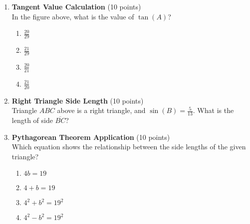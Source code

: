 \begin{enumerate}
  \newpage

  \item \textbf{Tangent Value Calculation} (10 points)\\
  In the figure above, what is the value of $\tan(A)$?
  \begin{enumerate}[label=(\Alph*)]
    \item $\frac{20}{29}$
    \item $\frac{21}{29}$
    \item $\frac{20}{21}$
    \item $\frac{21}{20}$
  \end{enumerate}
  \begin{subanswer}
  \end{subanswer}

  \item \textbf{Right Triangle Side Length} (10 points)\\
  Triangle $ABC$ above is a right triangle, and $\sin(B)=\frac{5}{13}$. What is the length of side $\overline{BC}$?
  \begin{subanswer}
  \end{subanswer}

  \newpage

  \item \textbf{Pythagorean Theorem Application} (10 points)\\
  Which equation shows the relationship between the side lengths of the given triangle?
  \begin{enumerate}[label=(\Alph*)]
    \item $4b=19$
    \item $4+b=19$
    \item $4^{2}+b^{2}=19^{2}$
    \item $4^{2}-b^{2}=19^{2}$
  \end{enumerate}
  \begin{subanswer}
  \end{subanswer}
\end{enumerate}